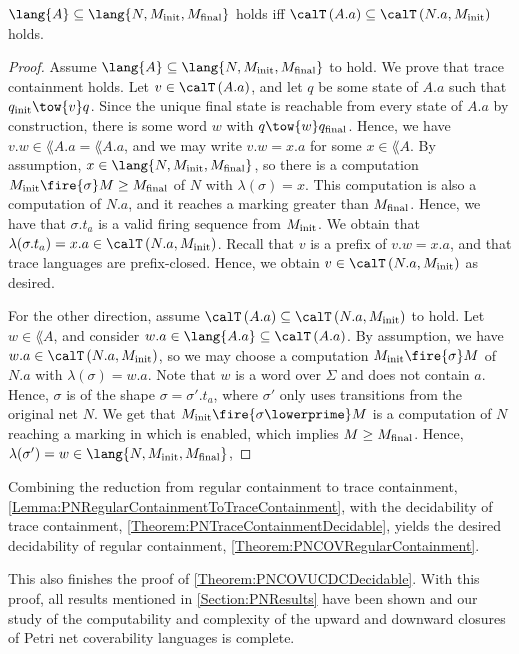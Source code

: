 \documentclass[../../diss.tex]{subfiles}
\begin{document}
\begin{lemma}%
\label{Lemma:PNRegularContainmentToTraceContainment}%
    $
        \lang{A} \subseteq \lang{N,\Minit, \Mfinal}
    $
    holds iff
    $
        \Traces{A.a} \subseteq \Traces{N.a, \Minit}
    $
    holds.
\end{lemma}

\begin{proof}
    Assume $\lang{A} \subseteq \lang{N,\Minit, \Mfinal}$ to hold.
    We prove that trace containment holds.
    Let $v \in \Traces{A.a}$, and let $q$ be some state of $A.a$ such that $q_\init \tow{v} q$.
    Since the unique final state is reachable from every state of $A.a$ by construction, there is some word $w$ with $q \tow{w} q_\final$.
    Hence, we have $v.w \in \lang{A.a} = \lang{A}.a$, and we may write $v.w = x.a$ for some $x \in \lang{A}$.
    By assumption, $x \in \lang{N,\Minit, \Mfinal}$, so there is a computation $\Minit \fire{\sigma} M \geq \Mfinal$ of $N$ with $\lambda(\sigma) = x$.
    This computation is also a computation of $N.a$, and it reaches a marking greater than $M_{\text{final}}$.
    Hence, we have that $\sigma.t_a$ is a valid firing sequence from $M_{\text{init}}$.
    We obtain that $\lambda(\sigma.t_a) = x.a \in \Traces{N.a,\Minit}$.
    Recall that $v$ is a prefix of $v.w = x.a$, and that trace languages are prefix-closed.
    Hence, we obtain $v \in \Traces{N.a,\Minit}$ as desired.

    For the other direction, assume $\Traces{A.a} \subseteq \Traces{N.a, \Minit}$ to hold.
    Let $w \in \lang{A}$, and consider $w.a \in \lang{A.a} \subseteq \Traces{A.a}$.
    By assumption, we have $w.a \in \Traces{N.a, \Minit}$, so we may choose a computation $\Minit \fire{\sigma} M$ of $N.a$ with $\lambda(\sigma) = w.a$.
    Note that $w$ is a word over $\Sigma$ and does not contain $a$.
    Hence, $\sigma$ is of the shape $\sigma = \sigma'.t_a$, where $\sigma'$ only uses transitions from the original net $N$.
    We get that $\Minit \fire{\sigma\lowerprime} M$ is a computation of $N$ reaching a marking in which  is enabled, which implies $M \geq M_{\text{final}}$.
    Hence, $\lambda(\sigma') = w \in \lang{N,\Minit,\Mfinal}$, 
\end{proof}

Combining the reduction from regular containment to trace containment, \cref{Lemma:PNRegularContainmentToTraceContainment}, with the decidability of trace containment, \cref{Theorem:PNTraceContainmentDecidable}, yields the desired decidability of regular containment, \cref{Theorem:PNCOVRegularContainment}.

This also finishes the proof of \cref{Theorem:PNCOVUCDCDecidable}.
With this proof, all results mentioned in \cref{Section:PNResults} have been shown and our study of the computability and complexity of the upward and downward closures of Petri net coverability languages is complete.
\end{document}
